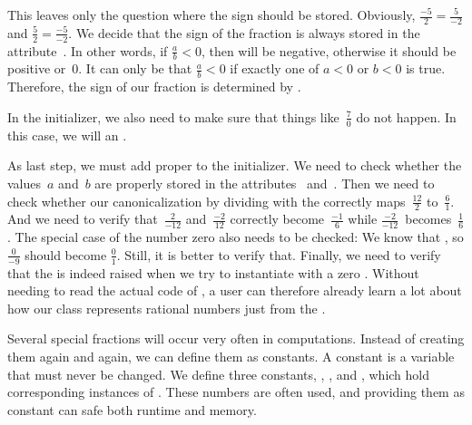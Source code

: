 This leaves only the question where the sign should be stored.
Obviously, $\frac{-5}{2}=\frac{5}{-2}$ and $\frac{5}{2}=\frac{-5}{-2}$.
We decide that the sign of the fraction is always stored in the attribute~.
In other words, if $\frac{a}{b}<0$, then  will be negative, otherwise it should be positive or~0.
It can only be that $\frac{a}{b}<0$ if exactly one of $a<0$ or $b<0$ is true.
Therefore, the sign of our fraction is determined by .

In the initializer, we also need to make sure that things like~$\frac{7}{0}$ do not happen.
In this case, we will  an .

As last step, we must add proper  to the initializer.
We need to check whether the values~$a$ and~$b$ are properly stored in the attributes~ and~.
Then we need to check whether our canonicalization by dividing with the  correctly maps~$\frac{12}{2}$ to~$\frac{6}{1}$.
And we need to verify that~$\frac{2}{-12}$ and~$\frac{-2}{12}$ correctly become~$\frac{-1}{6}$ while $\frac{-2}{-12}$~becomes~$\frac{1}{6}$.
The special case of the number zero also needs to be checked:
We know that , so $\frac{0}{-9}$ should become $\frac{0}{1}$.
Still, it is better to verify that.
Finally, we need to verify that the  is indeed raised when we try to instantiate  with a zero .
Without needing to read the actual code of , a user can therefore already learn a lot about how our class  represents rational numbers just from the .

Several special fractions will occur very often in computations.
Instead of creating them again and again, we can define them as constants.
A constant is a variable that must never be changed.%
%
%
%
%
%
We define three constants, , , and , which hold corresponding instances of .
These numbers are often used, and providing them as constant can safe both runtime and memory.

